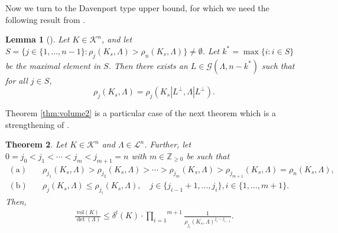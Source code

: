 \documentclass{amsart}
\newtheorem{theorem}{Theorem}[section]
\newtheorem{lemma}[theorem]{Lemma}
\theoremstyle{definition}
\theoremstyle{remark}
\numberwithin{equation}{section}
\begin{document}
Now we turn to the Davenport type upper bound, for which we need the following result from \cite{hsx2021}.

\begin{lemma}[]\label{lem:rho_projection2}
Let $K\in\mathcal{K}^n$, and let $S=\{j\in\{1,...,n-1\}:\rho_j(K_s,\Lambda)>\rho_n(K_s,\Lambda)\}\not=\emptyset$. Let $k^*=\max\{i: i\in S\}$ be the maximal element in $S$. Then there exists an $L\in\mathcal{G}(\Lambda,n-k^*)$ such that for all $j\in S$,
$$\rho_j(K_s,\Lambda)=\rho_j(K_s|L^\perp,\Lambda|L^\perp).$$ 
\end{lemma}

Theorem \ref{thm:volume2} is a particular case of the next theorem which is a strengthening of \cite[Theorem 4.4]{hsx2021}.

\begin{theorem}\label{volume2a}
Let $K\in\mathcal{K}^n$ and $\Lambda\in\mathcal{L}^n$. Further, let $0=j_0<j_1<\cdots<j_m<j_{m+1}=n$ with $m\in\mathbb{Z}_{\ge0}$ be such that
\begin{equation*}
\begin{split} 
    \mathrm{(a)}&\quad \rho_{j_1}(K_s,\Lambda)>\rho_{j_2}(K_s,\Lambda)>\cdots>\rho_{j_m}(K_s,\Lambda)>\rho_{j_{m+1}}(K_s,\Lambda)=\rho_n(K_s,\Lambda),\\
    \mathrm{(b)}&\quad\rho_j(K_s,\Lambda)\le\rho_{j_i}(K_s,\Lambda),  \quad j\in\{j_{i-1}+1,..., j_i\}, i\in\{1,...,m+1\}.
 \end{split}    
\end{equation*}
Then,
\begin{align}\label{vinequality2}
    \frac{\mathrm{vol}(K)}{\det(\Lambda)}\le\delta^l(K)\cdot\overset{m+1}{\underset{i=1}{\prod}}\frac1{\rho_{j_{i}}(K_s,\Lambda)^{j_{i}-j_{i-1}}}.
\end{align} 
\end{theorem}
\end{document}
